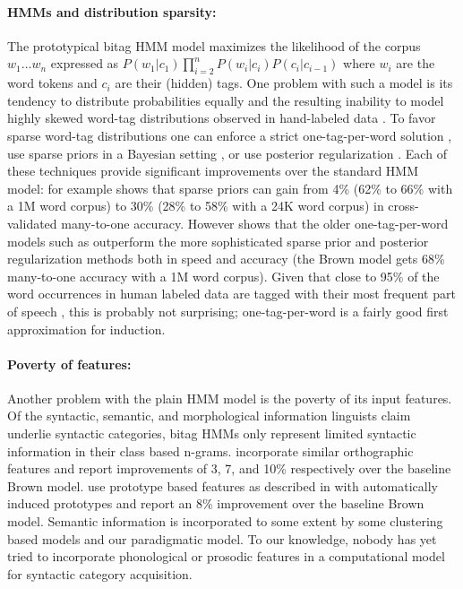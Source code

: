 \documentclass[11pt]{article}
\begin{document}
\paragraph{HMMs and distribution sparsity:}
The prototypical bitag HMM model maximizes the likelihood of the
corpus $w_1 \ldots w_n$ expressed as $P(w_1|c_1)\prod_{i=2}^n
P(w_i|c_i) P(c_i|c_{i-1})$ where $w_i$ are the word tokens and $c_i$
are their (hidden) tags.  One problem with such a model is its
tendency to distribute probabilities equally and the resulting
inability to model highly skewed word-tag distributions observed in
hand-labeled data \cite{johnson:2007:EMNLP-CoNLL2007}.  To favor
sparse word-tag distributions one can enforce a strict
one-tag-per-word solution
\cite{Brown:1992:CNG:176313.176316,Clark:2003:CDM:1067807.1067817},
use sparse priors in a Bayesian setting
\cite{goldwater-griffiths:2007:ACLMain,johnson:2007:EMNLP-CoNLL2007},
or use posterior regularization
\cite{Ganchev:2010:PRS:1859890.1859918}.  Each of these techniques
provide significant improvements over the standard HMM model: for
example \cite{Gao:2008:CBE:1613715.1613761} shows that sparse priors
can gain from 4\% (62\% to 66\% with a 1M word corpus) to 30\% (28\%
to 58\% with a 24K word corpus) in cross-validated many-to-one
accuracy.  However \cite{Christodoulopoulos:2010:TDU:1870658.1870714}
shows that the older one-tag-per-word models such as
\cite{Brown:1992:CNG:176313.176316} outperform the more sophisticated
sparse prior and posterior regularization methods both in speed and
accuracy (the Brown model gets 68\% many-to-one accuracy with a 1M
word corpus).  Given that close to 95\% of the word occurrences in
human labeled data are tagged with their most frequent part of speech
\cite{Lee:2010:STU:1870658.1870741}, this is probably not surprising;
one-tag-per-word is a fairly good first approximation for induction.

\paragraph{Poverty of features:}
Another problem with the plain HMM model is the poverty of its input
features.  Of the syntactic, semantic, and morphological information
linguists claim underlie syntactic categories, bitag HMMs only
represent limited syntactic information in their class based n-grams.
\cite{Clark:2003:CDM:1067807.1067817,bergkirkpatrick-klein:2010:ACL,blunsom-cohn:2011:ACL-HLT2011}
incorporate similar orthographic features and report improvements of
3, 7, and 10\% respectively over the baseline Brown model.
\cite{Christodoulopoulos:2010:TDU:1870658.1870714} use prototype based
features as described in \cite{Haghighi:2006:PLS:1220835.1220876} with
automatically induced prototypes and report an 8\% improvement over
the baseline Brown model.  Semantic information is incorporated to
some extent by some clustering based models and our paradigmatic
model.  To our knowledge, nobody has yet tried to incorporate
phonological or prosodic features in a computational model for
syntactic category acquisition.
\end{document}
